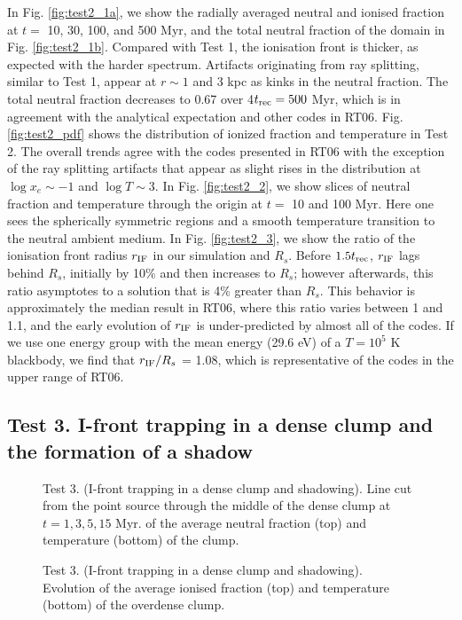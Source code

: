 \documentclass[useAMS,usenatbib]{mn2e}
\begin{document}
In Fig. \ref{fig:test2_1a}, we show the radially averaged neutral and
ionised fraction at $t = $ 10, 30, 100, and 500 Myr, and the total
neutral fraction of the domain in Fig. \ref{fig:test2_1b}.  Compared
with Test 1, the ionisation front is thicker, as expected with the
harder spectrum.  Artifacts originating from ray splitting, similar to
Test 1, appear at $r \sim 1$ and 3 kpc as kinks in the neutral
fraction.  The total neutral fraction decreases to 0.67 over 4$t_{\rm
  rec} = 500$ Myr, which is in agreement with the analytical
expectation and other codes in RT06.  Fig. \ref{fig:test2_pdf} shows
the distribution of ionized fraction and temperature in Test 2.  The
overall trends agree with the codes presented in RT06 with the
exception of the ray splitting artifacts that appear as slight rises
in the distribution at $\log x_e \sim -1$ and $\log T \sim 3$. In
Fig. \ref{fig:test2_2}, we show slices of neutral fraction and
temperature through the origin at $t = $ 10 and 100 Myr.  Here one
sees the spherically symmetric \hii regions and a smooth temperature
transition to the neutral ambient medium.  In Fig. \ref{fig:test2_3},
we show the ratio of the ionisation front radius $r_{\rm IF}$ in our
simulation and $R_s$.  Before $1.5t_{\rm rec}$, $r_{\rm IF}$ lags
behind $R_s$, initially by 10\% and then increases to $R_s$; however
afterwards, this ratio asymptotes to a solution that is 4\% greater
than $R_s$.  This behavior is approximately the median result in RT06,
where this ratio varies between 1 and 1.1, and the early evolution of
$r_{\rm IF}$ is under-predicted by almost all of the codes.  If we use
one energy group with the mean energy (29.6 eV) of a $T=10^5$ K
blackbody, we find that $r_{\rm IF}/R_s$ = 1.08, which is
representative of the codes in the upper range of RT06.

\subsection{Test 3. I-front trapping in a dense clump and the
  formation of a shadow}
\label{sec:test3}

\begin{figure}
  \caption{\label{fig:test3_1} Test 3. (I-front trapping in a dense
    clump and shadowing).  Line cut from the point source through the
    middle of the dense clump at $t = 1, 3, 5, 15$ Myr.  of the
    average neutral fraction (top) and temperature (bottom) of the
    clump.}
\end{figure}

\begin{figure}
  \caption{\label{fig:test3_2} Test 3. (I-front trapping in a dense
    clump and shadowing).  Evolution of the average ionised fraction
    (top) and temperature (bottom) of the overdense clump.}
\end{figure}
\end{document}
